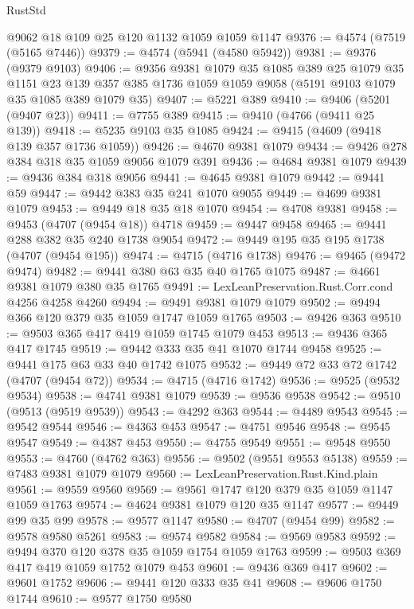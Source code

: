 \begin{lexlean}{RustStd}
\begin{coremodule}
{\begin{coremodule}
{{{{{{{{{{{{{{{{{{{{{{{{{{{{{{{{{{{    @9062
    @18
    @109
    @25
    @120
    @1132
    @1059
    @1059
    @1147
@9376 := @4574 (@7519 (@5165 @7446))
@9379 := @4574 (@5941 (@4580 @5942))
@9381 := @9376 (@9379 @9103)
@9406 := @9356
    @9381
    @1079
    @35
    @1085
    @389
    @25
    @1079
    @35
    @1151
    @23
    @139
    @357
    @385
    @1736
    @1059
    @1059
    @9058
    (@5191 @9103 @1079 @35 @1085 @389 @1079 @35)
@9407 := @5221 @389
@9410 := @9406 (@5201 (@9407 @23))
@9411 := @7755 @389
@9415 := @9410 (@4766 (@9411 @25 @139))
@9418 := @5235 @9103 @35 @1085
@9424 := @9415 (@4609 (@9418 @139 @357 @1736 @1059))
@9426 := @4670 @9381 @1079
@9434 := @9426 @278 @384 @318 @35 @1059 @9056 @1079 @391
@9436 := @4684 @9381 @1079
@9439 := @9436 @384 @318 @9056
@9441 := @4645 @9381 @1079
@9442 := @9441 @59
@9447 := @9442 @383 @35 @241 @1070 @9055
@9449 := @4699 @9381 @1079
@9453 := @9449 @18 @35 @18 @1070
@9454 := @4708 @9381
@9458 := @9453 (@4707 (@9454 @18)) @4718
@9459 := @9447 @9458
@9465 := @9441 @288 @382 @35 @240 @1738 @9054
@9472 := @9449 @195 @35 @195 @1738 (@4707 (@9454 @195))
@9474 := @4715 (@4716 @1738)
@9476 := @9465 (@9472 @9474)
@9482 := @9441 @380 @63 @35 @40 @1765 @1075
@9487 := @4661 @9381 @1079 @380 @35 @1765
@9491 := LexLeanPreservation.Rust.Corr.cond @4256 @4258 @4260
@9494 := @9491 @9381 @1079 @1079
@9502 := @9494 @366 @120 @379 @35 @1059 @1747 @1059 @1765
@9503 := @9426 @363
@9510 := @9503 @365 @417 @419 @1059 @1745 @1079 @453
@9513 := @9436 @365 @417 @1745
@9519 := @9442 @333 @35 @41 @1070 @1744 @9458
@9525 := @9441 @175 @63 @33 @40 @1742 @1075
@9532 := @9449 @72 @33 @72 @1742 (@4707 (@9454 @72))
@9534 := @4715 (@4716 @1742)
@9536 := @9525 (@9532 @9534)
@9538 := @4741 @9381 @1079
@9539 := @9536 @9538
@9542 := @9510 (@9513 (@9519 @9539))
@9543 := @4292 @363
@9544 := @4489 @9543
@9545 := @9542 @9544
@9546 := @4363 @453
@9547 := @4751 @9546
@9548 := @9545 @9547
@9549 := @4387 @453
@9550 := @4755 @9549
@9551 := @9548 @9550
@9553 := @4760 (@4762 @363)
@9556 := @9502 (@9551 @9553 @5138)
@9559 := @7483 @9381 @1079 @1079
@9560 := LexLeanPreservation.Rust.Kind.plain
@9561 := @9559 @9560
@9569 := @9561 @1747 @120 @379 @35 @1059 @1147 @1059 @1763
@9574 := @4624 @9381 @1079 @120 @35 @1147
@9577 := @9449 @99 @35 @99
@9578 := @9577 @1147
@9580 := @4707 (@9454 @99)
@9582 := @9578 @9580 @5261
@9583 := @9574 @9582
@9584 := @9569 @9583
@9592 := @9494 @370 @120 @378 @35 @1059 @1754 @1059 @1763
@9599 := @9503 @369 @417 @419 @1059 @1752 @1079 @453
@9601 := @9436 @369 @417
@9602 := @9601 @1752
@9606 := @9441 @120 @333 @35 @41
@9608 := @9606 @1750 @1744
@9610 := @9577 @1750 @9580
}}}}}}}}}}}}}}}}}}}}}}}}}}}}}}}}}}}
\end{coremodule}}
\end{coremodule}
\end{lexlean}
